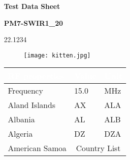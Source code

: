 \documentclass{article}%
\begin{document}
%
\normalsize%
%
\vspace{25mm}%
\begin{spacing}{1.5}%
\begin{center} {\Large \textbf{Test Data Sheet} \par}%
\end{center}%
\end{spacing}%
\begin{center} {\large\textbf{PM7-SWIR1\_20} \par} \end{center}%
\begin{center} {\normalsize 22.1234 \par} \end{center}%
\begin{figure}[h]%
\texttt{[image: kitten.jpg]}%
\centering%
\end{figure}%
\begin{table}[h]%
\centering%
\begin{tabular}{ |p{10cm}|p{3cm}|p{1.5cm}|  }%
\hline%
\rowcolor[HTML]{153c4a}%
\textcolor{white}{RF properties}  & \hfil \textcolor{white}{Value} & \hfil \textcolor{white}{Unit}  \\%
\hline%
Frequency & \hfil 15.0 & \hfil MHz \\%
\hline%
Aland Islands & \hfil AX   & \hfil ALA \\%
\hline%
Albania & \hfil AL & \hfil ALB \\%
\hline%
Algeria    & \hfil DZ & \hfil DZA \\%
\hline%
American Samoa & \multicolumn{2}{|c|}{Country List} \\%
\hline%
\end{tabular}%
\end{table}%
%
%
%
%
\end{document}
